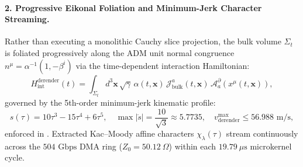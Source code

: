 \documentclass[11pt,onecolumn]{article}
\begin{document}
\paragraph{2. Progressive Eikonal Foliation and Minimum-Jerk Character Streaming.}
Rather than executing a monolithic Cauchy slice projection, the bulk volume $\Sigma_t$ is foliated progressively along the ADM unit normal congruence $n^\mu = \alpha^{-1}(1, -\beta^i)$ via the time-dependent interaction Hamiltonian:
\begin{equation}
  H_{\text{int}}^{\text{derender}}(t) = \int_{\Sigma_t} d^3\mathbf{x}\,\sqrt{\gamma}\,\alpha(t,\mathbf{x})\,\mathcal{J}^a_{\text{bulk}}(t,\mathbf{x})\,\mathcal{A}_a^\partial\left(x^\mu(t,\mathbf{x})\right),
\end{equation}
governed by the 5th-order minimum-jerk kinematic profile:
\begin{equation}
\label{eq:eikonal_poly}
  s(\tau) = 10\tau^3 - 15\tau^4 + 6\tau^5, \quad \max |\ddot{s}| = \frac{10}{\sqrt{3}} \approx 5.7735, \quad v_{\text{derender}}^{\max} \le 56.988\text{ m/s},
\end{equation}
enforced in . Extracted Kac--Moody affine characters $\chi_\lambda(\tau)$ stream continuously across the $504\text{ Gbps}$ DMA ring ($Z_0 = 50.12\ \Omega$) within each $19.79\ \mu\text{s}$ microkernel cycle.
\end{document}

